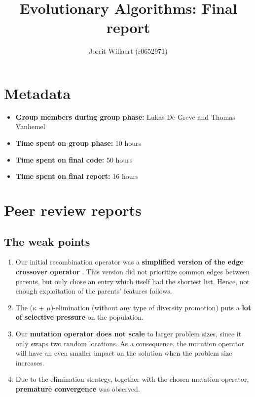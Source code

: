 \documentclass[a4paper,10pt]{article}
\title{Evolutionary Algorithms: Final report}
\author{Jorrit Willaert (r0652971)}
\begin{document}
\selectfont{}


\maketitle

\section{Metadata}

\begin{itemize}
 \item \textbf{Group members during group phase:} Lukas De Greve and Thomas Vanhemel
 \item \textbf{Time spent on group phase:} 10 hours
 \item \textbf{Time spent on final code:} 50 hours
 \item \textbf{Time spent on final report:} 16 hours
\end{itemize}

\section{Peer review reports}

\subsection{The weak points}
\begin{enumerate}
 \item Our initial recombination operator was a \textbf{simplified version of the edge crossover operator} \cite{initial_implementation_edge_crossover}. This version did not prioritize common edges between parents, but only chose an entry which itself had the shortest list. Hence, not enough exploitation of the parents' features follows. 
 \item The ($\kappa$ + $\mu$)-elimination (without any type of diversity promotion) puts a \textbf{lot of selective pressure} on the population.
 \item Our \textbf{mutation operator does not scale} to larger problem sizes, since it only swaps two random locations. As a consequence, the mutation operator will have an even smaller impact on the solution when the problem size increases. 
 \item Due to the elimination strategy, together with the chosen mutation operator, \textbf{premature convergence} was observed.
\end{enumerate}
\end{document}
